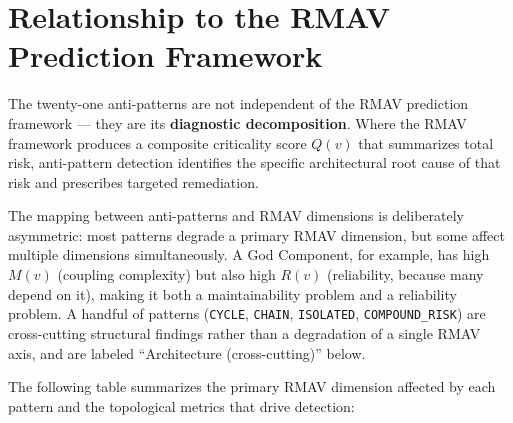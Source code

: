 \documentclass[11pt]{article}
\begin{document}
\section{Relationship to the RMAV Prediction Framework}

The twenty-one anti-patterns are not independent of the RMAV prediction framework --- they are its \textbf{diagnostic decomposition}. Where the RMAV framework produces a composite criticality score $Q(v)$ that summarizes total risk, anti-pattern detection identifies the specific architectural root cause of that risk and prescribes targeted remediation.

The mapping between anti-patterns and RMAV dimensions is deliberately asymmetric: most patterns degrade a primary RMAV dimension, but some affect multiple dimensions simultaneously. A God Component, for example, has high $M(v)$ (coupling complexity) but also high $R(v)$ (reliability, because many depend on it), making it both a maintainability problem and a reliability problem. A handful of patterns (\texttt{CYCLE}, \texttt{CHAIN}, \texttt{ISOLATED}, \texttt{COMPOUND\_RISK}) are cross-cutting structural findings rather than a degradation of a single RMAV axis, and are labeled ``Architecture (cross-cutting)'' below.

The following table summarizes the primary RMAV dimension affected by each pattern and the topological metrics that drive detection:
\end{document}
